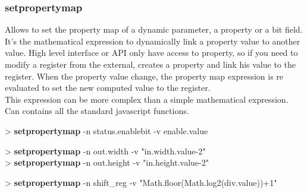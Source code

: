 \documentclass[10pt,a4paper]{article}
\begin{document}
\subsubsection{setpropertymap}

Allows to set the property map of a dynamic parameter, a property or a bit field. It's the mathematical expression to dynamically link a property value to another value. High level interface or API only have access to property, so if you need to modify a register from the external, creates a property and link his value to the register. When the property value change, the property map expression is re evaluated to set the new computed value to the register.\\

This expression can be more complex than a simple mathematical expression. Can contains all the standard javascript functions.\\


\begin{sampletitle}[1]
> \textbf{\tool{} setpropertymap} -n status.enablebit -v enable.value
\end{sampletitle}

\begin{sampletitle}[2]
> \textbf{\tool{} setpropertymap} -n out.width -v "in.width.value-2" \\
> \textbf{\tool{} setpropertymap} -n out.height -v "in.height.value-2"
\end{sampletitle}

\begin{sampletitle}[3]
> \textbf{\tool{} setpropertymap} -n shift\_reg -v "Math.floor(Math.log2(div.value))+1"
\end{sampletitle}
\end{document}
